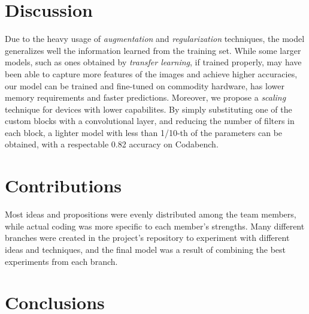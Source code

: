 \documentclass[11pt]{article}
\begin{document}
\begin{multicols}{2}
      \section{Discussion}

      Due to the heavy usage of \textit{augmentation} and \textit{regularization} techniques, the model generalizes well the information learned from the training set. While some larger models, such as ones obtained by \textit{transfer learning}, if trained properly, may have been able to capture more features of the images and achieve higher accuracies, our model can be trained and fine-tuned on commodity hardware, has lower memory requirements and faster predictions. Moreover, we propose a \textit{scaling} technique for devices with lower capabilites. By simply substituting one of the custom blocks with a convolutional layer, and reducing the number of filters in each block, a lighter model with less than 1/10-th of the parameters can be obtained, with a respectable 0.82 accuracy on Codabench. 

      \section{Contributions}

      Most ideas and propositions were evenly distributed among the team members, while actual coding was more specific to each member's strengths. Many different branches were created in the project's repository to experiment with different ideas and techniques, and the final model was a result of combining the best experiments from each branch.

      \section{Conclusions}


\end{multicols}
\end{document}

